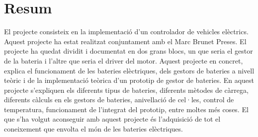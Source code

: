 \chapter{Resum}
\label{chap:Resum}

El projecte consisteix en la implementació d'un controlador de vehicles elèctrics. Aquest projecte ha estat realitzat conjuntament amb el Marc Brunet Preses. El projecte ha quedat dividit i documentat en dos grans blocs, un que seria el gestor de la bateria i l'altre que seria el driver del motor. Aquest projecte en concret, explica el funcionament de les bateries elèctriques, dels gestors de bateries a nivell teòric i de la implementació teòrica d'un prototip de gestor de bateries. En aquest projecte s'expliquen els diferents tipus de bateries, diferents mètodes de càrrega, diferents càlculs en els gestors de bateries, anivellació de cel·les, control de temperatura, funcionament de l'integrat del prototip, entre moltes més coses. El que s'ha volgut aconseguir amb aquest projecte és l'adquisició de tot el coneixement que envolta el món de les bateries elèctriques.